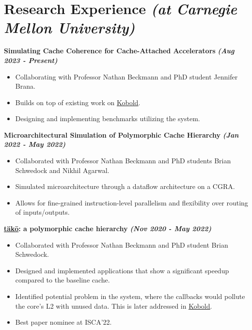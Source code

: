\documentclass[10pt]{article}
\begin{document}
    \section*{{\Large \textcolor{lighterB}{Research Experience}} {\normalsize \textit{\textcolor{lighterB}{(at Carnegie Mellon University)}}}}
  \vspace*{-0.23cm}

  \textbf{\large Simulating Cache Coherence for Cache-Attached Accelerators} {\hfill \textit{\textbf{(Aug 2023 - Present)}}}
  \vspace*{-0.17cm}
  \begin{itemize}
    \itemsep0em
    \item \textcolor{lighterG}{Collaborating with Professor Nathan Beckmann and PhD student Jennifer Brana.}
    \item \textcolor{lighterG}{Builds on top of existing work on \href{https://ieeexplore.ieee.org/document/10106564}{\underline{Kobold}}.}
    \item \textcolor{lighterG}{Designing and implementing benchmarks utilizing the system.}
  \end{itemize}

  \textbf{\large Microarchitectural Simulation of Polymorphic Cache Hierarchy} {\hfill \textit{\textbf{(Jan 2022 - May 2022)}}}
  \vspace*{-0.17cm}
  \begin{itemize}
    \itemsep0em
    \item \textcolor{lighterG}{Collaborated with Professor Nathan Beckmann and PhD students Brian Schwedock and Nikhil Agarwal.}
    \item \textcolor{lighterG}{Simulated microarchitecture through a dataflow architecture on a CGRA.}
    \item \textcolor{lighterG}{Allows for fine-grained instruction-level parallelism and flexibility over routing of inputs/outputs.}
  \end{itemize}

  \textbf{\large \href{https://dl.acm.org/doi/10.1145/3470496.3527379}{\underline{täkō}}: a polymorphic cache hierarchy} {\hfill \textit{\textbf{(Nov 2020 - May 2022)}}} 
  \vspace*{-0.17cm}
  \begin{itemize}
    \itemsep0em
    \item \textcolor{lighterG}{Collaborated with Professor Nathan Beckmann and PhD student Brian Schwedock.}
    \item \textcolor{lighterG}{Designed and implemented applications that show a significant speedup compared to the baseline cache.}
    \item \textcolor{lighterG}{Identified potential problem in the system, where the callbacks would pollute the core's L2 with unused data. This is later addressed in \href{https://ieeexplore.ieee.org/document/10106564}{\underline{Kobold}}.}
    \item \textcolor{lighterG}{Best paper nominee at ISCA'22.}
  \end{itemize}
\end{document}
